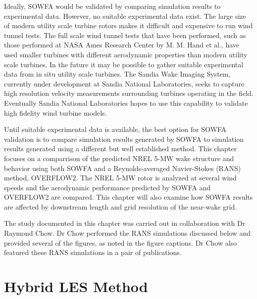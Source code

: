 Ideally, SOWFA would be validated by comparing simulation results to experimental data. However, no suitable experimental data exist. The large size of modern utility scale turbine rotors makes it difficult and expensive to run wind tunnel tests. The full scale wind tunnel tests that have been performed, such as those performed at NASA Ames Research Center by M. M. Hand et al.,\cite{simms2001} have used smaller turbines with different aerodynamic properties than modern utility scale turbines. In the future it may be possible to gather suitable experimental data from in situ utility scale turbines. The Sandia Wake Imaging System, currently under development at Sandia National Laboratories,\cite{herges2015,naughton2015,herges2015a} seeks to capture high resolution velocity measurements surrounding turbines operating in the field. Eventually Sandia National Laboratories hopes to use this capability to validate high fidelity wind turbine models.\cite{ herges2015a}

Until suitable experimental data is available, the best option for SOWFA validation is to compare simulation results generated by SOWFA to simulation results generated using a different but well established method. This chapter focuses on a comparrison of the predicted NREL 5-MW wake structure and behavior using both SOWFA and a Reynolds-averaged Navier-Stokes (RANS) method, OVERFLOW2. The NREL 5-MW rotor is analyzed at several wind speeds and the aerodynamic performance predicted by SOWFA and OVERFLOW2 are compared. This chapter will also examine how SOWFA results are affected by downstream length and grid resolution of the near-wake grid.

The study documented in this chapter was carried out in collaboration with Dr Raymond Chow.  Dr Chow performed the RANS simulations discussed below and provided several of the figures, as noted in the figure captions. Dr Chow also featured these RANS simulations in a pair of publications.\cite{chow2012,chow2013}


\section{Hybrid LES Method}\label{section5-2}

